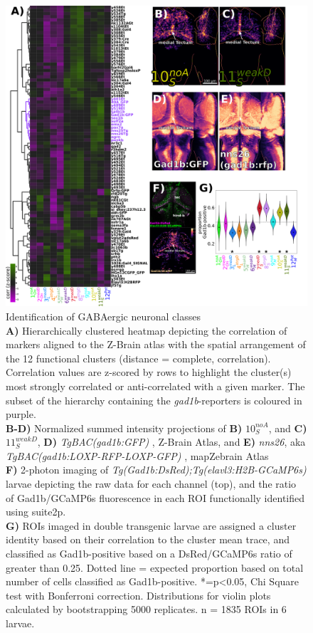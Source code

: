 \documentclass[9pt,lineno]{RandlettLab_elife}
\begin{document}
\begin{figure}
\begin{fullwidth}
\begin{center}
\includegraphics[width=0.99\linewidth]{Figure7 - Gad1bNeurons.png}
\caption{
Identification of GABAergic neuronal classes
\\ \textbf{A)} Hierarchically clustered heatmap depicting the correlation of markers aligned to the Z-Brain atlas with the spatial arrangement of the 12 functional clusters  (distance = complete, correlation). Correlation values are z-scored by rows to highlight the cluster(s) most strongly correlated or anti-correlated with a given marker. The subset of the hierarchy containing the \emph{gad1b}-reporters is coloured in purple. 
\\ \textbf{B-D)} Normalized summed intensity projections of \textbf{B)} $10_{S}^{noA}$, and \textbf{C)} $11_{S}^{weakD}$, \textbf{D)} \emph{TgBAC(gad1b:GFP)} \citep{Satou2013-pp}, Z-Brain Atlas, and \textbf{E)} \emph{nns26}, aka \emph{TgBAC(gad1b:LOXP-RFP-LOXP-GFP)} \citep{Satou2013-pp}, mapZebrain Atlas
\\ \textbf{F)} 2-photon imaging of \emph{Tg(Gad1b:DsRed);Tg(elavl3:H2B-GCaMP6s)} larvae depicting the raw data for each channel (top), and the ratio of Gad1b/GCaMP6s fluorescence in each ROI functionally identified using suite2p. 
\\ \textbf{G)} ROIs imaged in double transgenic larvae are assigned a cluster identity based on their correlation to the cluster mean trace, and classified as Gad1b-positive based on a DsRed/GCaMP6s ratio of greater than 0.25. Dotted line = expected proportion based on total number of cells classified as Gad1b-positive. *=p<0.05, Chi Square test with Bonferroni correction. Distributions for violin plots calculated by bootstrapping 5000 replicates. n = 1835 ROIs in 6 larvae. 
}
\label{fig:7}
\end{center}
\end{fullwidth}
\end{figure}
\end{document}
